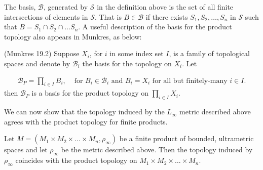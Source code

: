  The basis, $\mathcal{B}$, generated by $\mathcal{S}$ in the definition above is the set of all finite intersections of elements in $\mathcal{S}$. That is $B \in \mathcal{B}$ if there exists $S_1, S_2, \ldots, S_n$ in $\mathcal{S}$ such that $B = S_1 \cap S_2 \cap \ldots S_n$.  A useful description of the basis for the product topology also appears in Munkres, as below:

\begin{proposition} (Munkres 19.2)
Suppose $X_i$, for $i$ in some index set $I$, is a family of topological spaces and denote by $\mathcal{B}_i$ the basis for the topology on $X_i$. Let 

\begin{align*}
\mathcal{B}_P = \prod_{i \in I} B_i, & \text{ for }  B_i \in \mathcal{B}_i \text { and } B_i = X_i \text{ for all but finitely-many } i \in I. 
\end{align*}
then $\mathcal{B}_P$ is a basis for the product topology on $\prod_{i \in I} X_i$.\\

\end{proposition}

We can now show that the topology induced by the $L_\infty$ metric described above agrees with the product topology for finite products.

\begin{proposition}
Let $M=(M_{1} \times M_{2} \times \ldots \times M_{n},\rho_\infty)$ be a finite product of bounded, ultrametric spaces and let $\rho_\infty$ be the metric described above.  Then the topology induced by $\rho_\infty$ coincides with the product topology on $M_{1} \times M_{2} \times \ldots \times M_{n}$.
\end{proposition}

